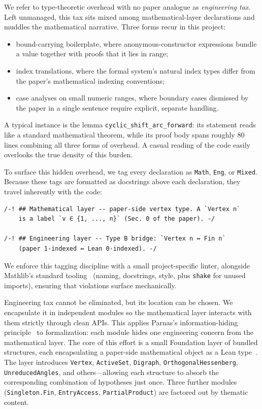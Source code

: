 We refer to type-theoretic overhead with no paper analogue as
\emph{engineering tax}. Left unmanaged, this tax sits mixed among
mathematical-layer declarations and muddles the mathematical narrative.
Three forms recur in this project:
\begin{itemize}[leftmargin=2em, itemsep=2pt, topsep=2pt]
\item bound-carrying boilerplate, where anonymous-constructor
  expressions bundle a value together with proofs that it lies in range;
\item index translations, where the formal system's natural index
  types differ from the paper's mathematical indexing conventions;
\item case analyses on small numeric ranges, where boundary cases
  dismissed by the paper in a single sentence require explicit,
  separate handling.
\end{itemize}
A typical instance is the lemma \texttt{cyclic\_shift\_arc\_forward}:
its statement reads like a standard mathematical theorem, while its proof body
spans roughly $80$ lines combining all three forms of overhead. A casual
reading of the code easily overlooks the true density of this burden.

To surface this hidden overhead, we tag every declaration as \texttt{Math}, 
\texttt{Eng}, or \texttt{Mixed}. Because these tags are formatted as docstrings 
above each declaration, they travel inherently with the code:
\begin{lstlisting}
/-! ## Mathematical layer -- paper-side vertex type. A `Vertex n`
    is a label `v ∈ {1, ..., n}` (Sec. 0 of the paper). -/

/-! ## Engineering layer -- Type B bridge: `Vertex n ↔ Fin n`
    (paper 1-indexed ↔ Lean 0-indexed). -/
\end{lstlisting}
We enforce this tagging discipline with a small project-specific linter, 
alongside Mathlib's standard tooling~\cite{The_mathlib_Community_2020} 
(naming, docstrings, style, plus \texttt{shake} for unused imports), 
ensuring that violations surface mechanically.

Engineering tax cannot be eliminated, but its location can be chosen.
We encapsulate it in independent modules so the mathematical layer
interacts with them strictly through clean APIs. This applies Parnas's
information-hiding principle~\cite{Parnas1972} to formalization: each
module hides one engineering concern from the mathematical layer. The
core of this effort is a small Foundation layer of bundled structures,
each encapsulating a paper-side mathematical object as a Lean
type~\cite{Baanen_2022, commelin2023abstractionboundariesspecdriven, pittphilsci13482}.
The layer introduces \texttt{Vertex}, \texttt{ActiveSet},
\texttt{Digraph}, \texttt{OrthogonalHessenberg},
\texttt{UnreducedAngles}, and others---allowing each structure to absorb the
corresponding combination of hypotheses just once. Three further modules
(\texttt{Singleton.Fin}, \texttt{EntryAccess},
\texttt{PartialProduct}) are factored out by thematic content.

